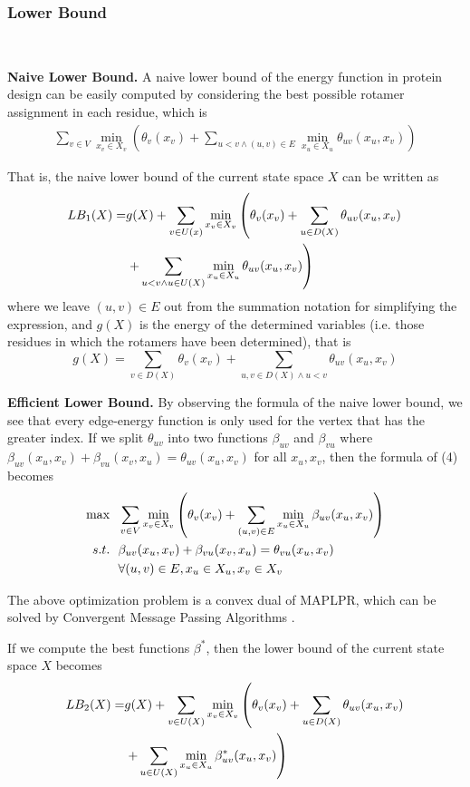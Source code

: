 \subsubsection{Lower Bound}\ 

\noindent\textbf{Naive Lower Bound.}
A naive lower bound of the energy function in protein design can be easily computed by considering the best possible rotamer assignment in each residue, which is
\begin{align}
\sum_{v\in V}\min_{x_v\in X_v}\left(\theta_v(x_v)+\sum_{u<v\wedge(u,v)\in E}\min_{x_u\in X_u}\theta_{uv}(x_u,x_v)\right)
\end{align}

That is, the naive lower bound of the current state space $X$ can be written as
\begin{align}
LB_1(X)=&g(X)+\sum_{v\in U(x)}\min_{x_v\in X_v}\left(\theta_v(x_v)+\sum_{u\in D(X)}\theta_{uv}(x_u,x_v)\notag\right. \\
&\left.+\sum_{u<v\wedge u\in U(X)}\min_{x_u\in X_u}\theta_{uv}(x_u,x_v)\right)
\end{align}
where we leave $(u,v)\in E$ out from the summation notation for simplifying the expression, and $g(X)$ is the energy of the determined variables (i.e. those residues in which the rotamers have been determined), that is
\[
g(X) = \sum_{v\in D(X)}\theta_v(x_v)+\sum_{u,v\in D(X)\wedge u<v}\theta_{uv}(x_u,x_v)
\]

\noindent\textbf{Efficient Lower Bound.}
By observing the formula of the naive lower bound, we see that every edge-energy function is only used for the vertex that has the greater index. If we split $\theta_{uv}$ into two functions $\beta_{uv}$ and $\beta_{vu}$ where $\beta_{uv}(x_u,x_v)+\beta_{vu}(x_v,x_u)=\theta_{uv}(x_u,x_v)$ for all $x_u,x_v$, then the formula of (4) becomes
\begin{align}
\max & \ \ \sum_{v\in V}\min_{x_v\in X_v}\left(\theta_v(x_v)+\sum_{(u,v)\in E}\min_{x_u\in X_u}\beta_{uv}(x_u,x_v)\right) \\
s.t. & \ \ \beta_{uv}(x_u,x_v)+\beta_{vu}(x_v,x_u)=\theta_{vu}(x_u,x_v) \notag \\
& \ \ \forall (u,v)\in E,x_u\in X_u,x_v\in X_v \notag
\end{align}

The above optimization problem is a convex dual of MAPLPR, which can be solved by Convergent Message Passing Algorithms \cite[]{globerson2008fixing}.

If we compute the best functions $\beta^*$, then the lower bound of the current state space $X$ becomes
\begin{align}
LB_2(X)=&g(X)+\sum_{v\in U(X)}\min_{x_v\in X_v}\left(\theta_v(x_v)+\sum_{u\in D(X)}\theta_{uv}(x_u,x_v)\right. \notag \\
&\left.+\sum_{u\in U(X)}\min_{x_u\in X_u}\beta_{uv}^*(x_u,x_v)\right)
\end{align}

